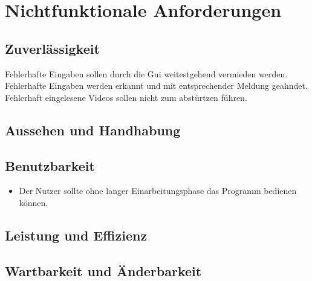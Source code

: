 \chapter{Nichtfunktionale Anforderungen}
\section{Zuverlässigkeit}
\setcounter{counterKriterien}{0}
 Fehlerhafte Eingaben sollen durch die Gui weitestgehend vermieden werden.
 Fehlerhafte Eingaben werden erkannt und mit entsprechender Meldung geahndet.
 Fehlerhaft eingelesene Videos sollen nicht zum abstürtzen führen.
\section{Aussehen und Handhabung}
\section{Benutzbarkeit}
\begin{itemize}
\item Der Nutzer sollte ohne langer Einarbeitungsphase das Programm bedienen können.
\end{itemize}
\section{Leistung und Effizienz}
\section{Wartbarkeit und Änderbarkeit}
